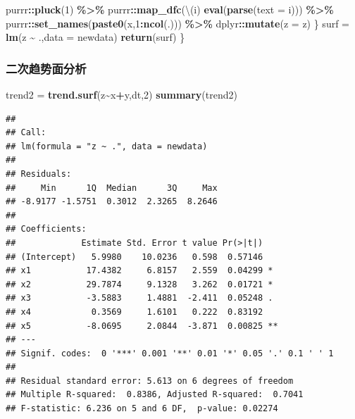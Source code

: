 \documentclass[
]{article}
\newenvironment{Shaded}{\begin{snugshade}}{\end{snugshade}}
\newcommand{\AttributeTok}[1]{\textcolor[rgb]{0.13,0.29,0.53}{#1}}
\newcommand{\DecValTok}[1]{\textcolor[rgb]{0.00,0.00,0.81}{#1}}
\newcommand{\FunctionTok}[1]{\textcolor[rgb]{0.13,0.29,0.53}{\textbf{#1}}}
\newcommand{\NormalTok}[1]{#1}
\newcommand{\OtherTok}[1]{\textcolor[rgb]{0.56,0.35,0.01}{#1}}
\newcommand{\SpecialCharTok}[1]{\textcolor[rgb]{0.81,0.36,0.00}{\textbf{#1}}}
\newcommand{\StringTok}[1]{\textcolor[rgb]{0.31,0.60,0.02}{#1}}
\begin{document}
\begin{Shaded}
\begin{Highlighting}[]
\NormalTok{    purrr}\SpecialCharTok{::}\FunctionTok{pluck}\NormalTok{(}\DecValTok{1}\NormalTok{) }\SpecialCharTok{\%\textgreater{}\%} 
\NormalTok{    purrr}\SpecialCharTok{::}\FunctionTok{map\_dfc}\NormalTok{(\textbackslash{}(i) }\FunctionTok{eval}\NormalTok{(}\FunctionTok{parse}\NormalTok{(}\AttributeTok{text =}\NormalTok{ i))) }\SpecialCharTok{\%\textgreater{}\%} 
\NormalTok{    purrr}\SpecialCharTok{::}\FunctionTok{set\_names}\NormalTok{(}\FunctionTok{paste0}\NormalTok{(}\StringTok{\textquotesingle{}x\textquotesingle{}}\NormalTok{,}\DecValTok{1}\SpecialCharTok{:}\FunctionTok{ncol}\NormalTok{(.))) }\SpecialCharTok{\%\textgreater{}\%} 
\NormalTok{    dplyr}\SpecialCharTok{::}\FunctionTok{mutate}\NormalTok{(}\AttributeTok{z =}\NormalTok{ z)}
\NormalTok{    \}}
\NormalTok{  surf }\OtherTok{=} \FunctionTok{lm}\NormalTok{(}\StringTok{\textquotesingle{}z \textasciitilde{} .\textquotesingle{}}\NormalTok{,}\AttributeTok{data =}\NormalTok{ newdata)}
  \FunctionTok{return}\NormalTok{(surf)}
\NormalTok{\}}
\end{Highlighting}
\end{Shaded}

\subsubsection{二次趋势面分析}\label{ux4e8cux6b21ux8d8bux52bfux9762ux5206ux6790}

\begin{Shaded}
\begin{Highlighting}[]
\NormalTok{trend2 }\OtherTok{=} \FunctionTok{trend.surf}\NormalTok{(z}\SpecialCharTok{\textasciitilde{}}\NormalTok{x}\SpecialCharTok{+}\NormalTok{y,dt,}\DecValTok{2}\NormalTok{)}
\FunctionTok{summary}\NormalTok{(trend2)}
\end{Highlighting}
\end{Shaded}

\begin{verbatim}
## 
## Call:
## lm(formula = "z ~ .", data = newdata)
## 
## Residuals:
##     Min      1Q  Median      3Q     Max 
## -8.9177 -1.5751  0.3012  2.3265  8.2646 
## 
## Coefficients:
##             Estimate Std. Error t value Pr(>|t|)   
## (Intercept)   5.9980    10.0236   0.598  0.57146   
## x1           17.4382     6.8157   2.559  0.04299 * 
## x2           29.7874     9.1328   3.262  0.01721 * 
## x3           -3.5883     1.4881  -2.411  0.05248 . 
## x4            0.3569     1.6101   0.222  0.83192   
## x5           -8.0695     2.0844  -3.871  0.00825 **
## ---
## Signif. codes:  0 '***' 0.001 '**' 0.01 '*' 0.05 '.' 0.1 ' ' 1
## 
## Residual standard error: 5.613 on 6 degrees of freedom
## Multiple R-squared:  0.8386, Adjusted R-squared:  0.7041 
## F-statistic: 6.236 on 5 and 6 DF,  p-value: 0.02274
\end{verbatim}
\end{document}
